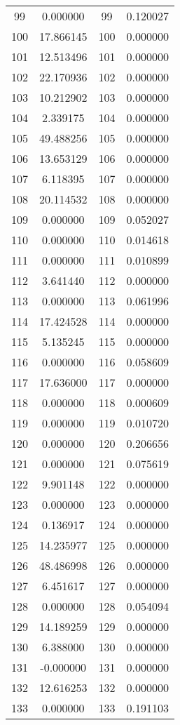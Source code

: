 \documentclass[12pt]{article}
\begin{document}
\begin{longtable}{@{}cccc@{}}
99 & 0.000000 & 99 & 0.120027 \\
100 & 17.866145 & 100 & 0.000000 \\
101 & 12.513496 & 101 & 0.000000 \\
102 & 22.170936 & 102 & 0.000000 \\
103 & 10.212902 & 103 & 0.000000 \\
104 & 2.339175 & 104 & 0.000000 \\
105 & 49.488256 & 105 & 0.000000 \\
106 & 13.653129 & 106 & 0.000000 \\
107 & 6.118395 & 107 & 0.000000 \\
108 & 20.114532 & 108 & 0.000000 \\
109 & 0.000000 & 109 & 0.052027 \\
110 & 0.000000 & 110 & 0.014618 \\
111 & 0.000000 & 111 & 0.010899 \\
112 & 3.641440 & 112 & 0.000000 \\
113 & 0.000000 & 113 & 0.061996 \\
114 & 17.424528 & 114 & 0.000000 \\
115 & 5.135245 & 115 & 0.000000 \\
116 & 0.000000 & 116 & 0.058609 \\
117 & 17.636000 & 117 & 0.000000 \\
118 & 0.000000 & 118 & 0.000609 \\
119 & 0.000000 & 119 & 0.010720 \\
120 & 0.000000 & 120 & 0.206656 \\
121 & 0.000000 & 121 & 0.075619 \\
122 & 9.901148 & 122 & 0.000000 \\
123 & 0.000000 & 123 & 0.000000 \\
124 & 0.136917 & 124 & 0.000000 \\
125 & 14.235977 & 125 & 0.000000 \\
126 & 48.486998 & 126 & 0.000000 \\
127 & 6.451617 & 127 & 0.000000 \\
128 & 0.000000 & 128 & 0.054094 \\
129 & 14.189259 & 129 & 0.000000 \\
130 & 6.388000 & 130 & 0.000000 \\
131 & -0.000000 & 131 & 0.000000 \\
132 & 12.616253 & 132 & 0.000000 \\
133 & 0.000000 & 133 & 0.191103 \\

\end{longtable}
\end{document}
